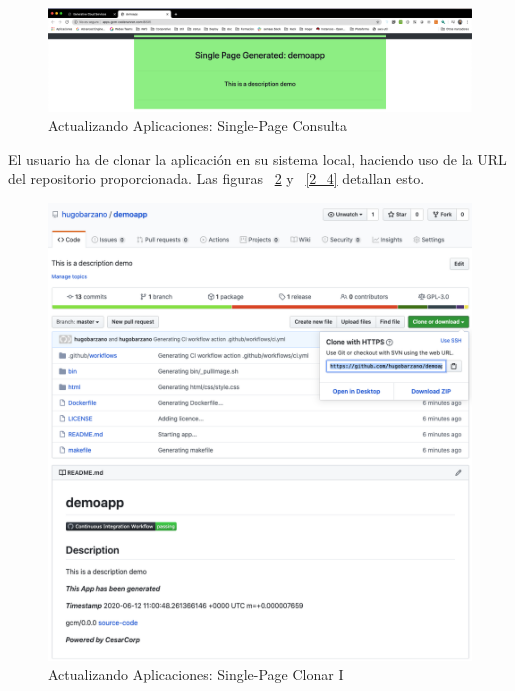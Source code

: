 \documentclass[a4paper,11pt]{book}
\begin{document}
\begin{figure}[H]
\centering
\includegraphics[scale=0.2]{imagenes/casouso_a/2_2.png}
\caption{  Actualizando Aplicaciones: Single-Page Consulta }
\label{2_2}
\end{figure}

 El usuario ha de clonar la aplicación en su sistema local, haciendo uso de la URL del repositorio proporcionada. Las figuras ~\ref{2_3} y ~\ref{2_4} detallan esto. 
 
 \begin{figure}[H]
\centering
\includegraphics[scale=0.4]{imagenes/casouso_a/2_3.png}
\caption{  Actualizando Aplicaciones: Single-Page Clonar I }
\label{2_3}
\end{figure}
\end{document}
